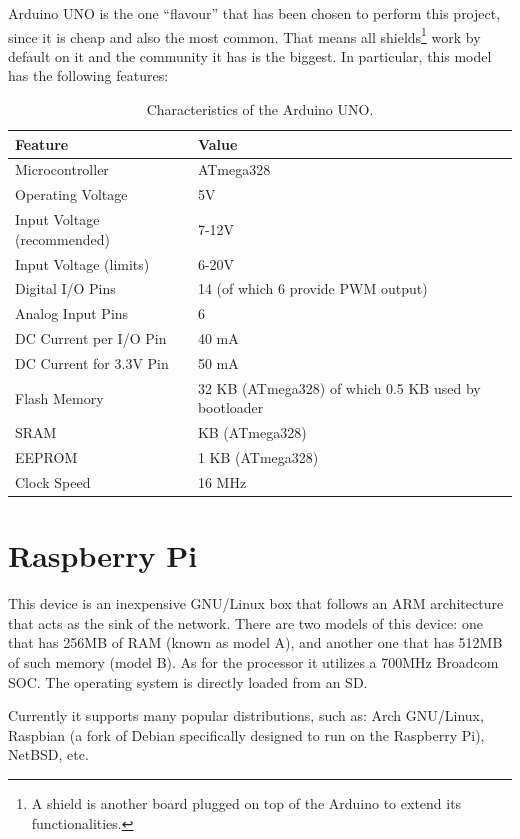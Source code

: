 Arduino UNO is the one ``flavour'' that has been chosen to perform this project, since it is cheap and also the most common. That means all shields\footnote{A shield is another board plugged on top of the Arduino to extend its functionalities.}  work by default on it and the community it has is the biggest. In particular, this model has the following features\citep{arduinounor3}:
\\

\begin{table}[ht] 
\centering
\begin{tabular}{l|l}
    Feature     & Value\\
\hline
Microcontroller	& ATmega328\\
Operating Voltage &	5V\\
Input Voltage (recommended) & 7-12V\\
Input Voltage (limits) & 6-20V\\
Digital I/O Pins & 14 (of which 6 provide PWM output)\\
Analog Input Pins & 6\\
DC Current per I/O Pin & 40 mA\\
DC Current for 3.3V Pin & 50 mA\\
Flash Memory & 32 KB (ATmega328) of which 0.5 KB used by bootloader\\
SRAM & KB (ATmega328)\\
EEPROM &	1 KB (ATmega328)\\
Clock Speed &	16 MHz\\
\end{tabular}
\caption{Characteristics of the Arduino UNO.}
\end{table}


\section{Raspberry Pi}

This device is an inexpensive GNU/Linux box that follows an ARM architecture that acts as the sink of the network. There are two models of this device: one that has 256MB of RAM (known as model A), and another one that has 512MB of such memory (model B). As for the processor it utilizes a 700MHz Broadcom SOC. The operating system is directly loaded from an SD.

Currently it supports many popular distributions, such as: Arch GNU/Linux, Raspbian (a fork of Debian specifically designed to run on the Raspberry Pi), NetBSD, etc.


